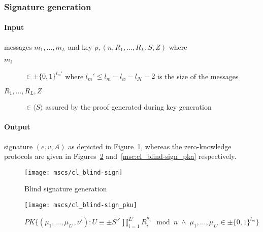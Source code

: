 \subsubsection{Signature generation}\label{sec:cl_blind-sign}

\paragraph{Input} messages $m_1, \dots, m_L$ and key $p, (n, R_1, \dots, R_L, S, Z)$ where
\begin{description}
  \item[$m_i$] $\in \pm \{0,1\}^{l_m'}$ where $l_m' \leq l_m - l_\varnothing - l_\mathcal{H} - 2$ is the size of the messages
  \item[$R_1, \dots, R_L, Z$] $\in \langle S \rangle$ assured by the proof generated during key generation
\end{description}

\paragraph{Output} signature $(e, v, A)$ as depicted in Figure~\ref{msc:cl_blind-sign}, whereas the zero-knowledge protocols are given in Figures~\ref{msc:cl_blind-sign_pku} and~\ref{msc:cl_blind-sign_pka} respectively.


\begin{figure}[ht]
  \centering
  \texttt{[image: mscs/cl\_blind-sign]}
  \caption{Blind signature generation}
  \label{msc:cl_blind-sign}
\end{figure}

\begin{figure}[ht]
  \centering
  \texttt{[image: mscs/cl\_blind-sign\_pku]}
  \caption{$PK\{(\mu_1, \dots, \mu_{L'}, \nu') :
    U \equiv \pm S^{\nu'} \prod_{i=1}^{L'} R_i^{\mu_i} \mod n \;\land\; \mu_1, \dots, \mu_{L'} \in \pm\{0,1\}^{l_m} \}$}
  \label{msc:cl_blind-sign_pku}
\end{figure}


